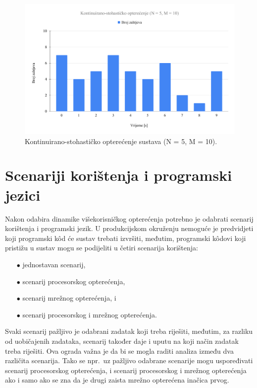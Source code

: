\documentclass[times, utf8, diplomski]{fer}
\begin{document}
\begin{figure}[htb]
	\centering
	\includegraphics[width=\textwidth]{images/Kontinuirano-stohastičko opterećenje (N = 5, M = 10).pdf}
	\caption{
		Kontinuirano-stohastičko opterećenje sustava (N = 5, M = 10).
	}
	\label{fig:cs-load}
\end{figure}

\pagebreak

\section{Scenariji korištenja i programski jezici}
Nakon odabira dinamike višekorisničkog opterećenja potrebno je odabrati scenarij korištenja i programski jezik. U produkcijskom okruženju nemoguće je predvidjeti koji programski kôd će sustav trebati izvršiti, međutim, programski kôdovi koji pristižu u sustav mogu se podijeliti u četiri scenarija korištenja:
\begin{itemize}
    \item[$\bullet$] jednostavan scenarij,
    \item[$\bullet$] scenarij procesorskog opterećenja,
    \item[$\bullet$] scenarij mrežnog opterećenja, i
    \item[$\bullet$] scenarij procesorskog i mrežnog opterećenja.
\end{itemize}

Svaki scenarij pažljivo je odabrani zadatak koji treba riješiti, međutim, za razliku od uobičajenih zadataka, scenarij također daje i uputu na koji način zadatak treba riješiti. Ova ograda važna je da bi se mogla raditi analiza između dva različita scenarija. Tako se npr.\ uz pažljivo odabrane scenarije mogu uspoređivati scenarij procesorskog opterećenja, i scenarij procesorskog i mrežnog opterećenja ako i samo ako se zna da je drugi zaista mrežno opterećena inačica prvog.
\end{document}
